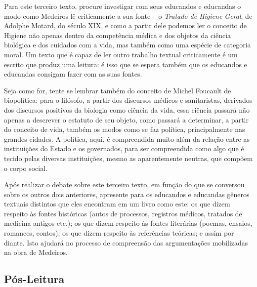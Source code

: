 \documentclass[12pt]{extarticle}
\begin{document}
Para este terceiro texto, procure investigar com seus educandos e
educandas o modo como Medeiros lê criticamente a sua fonte -- o
\emph{Tratado de Higiene Geral}, de Adolphe Motard, do século XIX, e
como a partir dele podemos ler o conceito de Higiene não apenas dentro
da competência médica e dos objetos da ciência biológica e dos cuidados
com a vida, mas também como uma espécie de categoria moral. Um texto que
é capaz de ler outro trabalho textual criticamente é um escrito que
produz uma leitura: é isso que se espera também que os educandos e
educandas consigam fazer com as suas fontes.

Seja como for, tente se lembrar também do conceito de Michel Foucault de
biopolítica: para o filósofo, a partir dos discursos médicos e
sanitaristas, derivados dos discursos positivos da biologia como ciência
da vida, essa ciência passará não apenas a descrever o estatuto de seu
objeto, como passará a determinar, a partir do conceito de vida, também
os modos como se faz política, principalmente nas grandes cidades. A
política, aqui, é compreendida muito além da relação entre as
instituições do Estado e os governados, para ser compreendida como algo
que é tecido pelas diversas instituições, mesmo as aparentemente
neutras, que compõem o corpo social.

Após realizar o debate sobre este terceiro texto, em função do que se
conversou sobre os outros dois anteriores, apresente para os educandos e
educandas gêneros textuais distintos que eles encontram em um livro como
este: os que dizem respeito às fontes históricas (autos de processos,
registros médicos, tratados de medicina antigos etc.); os que dizem
respeito às fontes literárias (poemas, ensaios, romances, contos); os
que dizem respeito às referências teóricas; e assim por diante. Isto
ajudará no processo de compreensão das argumentações mobilizadas na obra
de Medeiros.

\subsection{Pós-Leitura}

\end{document}
